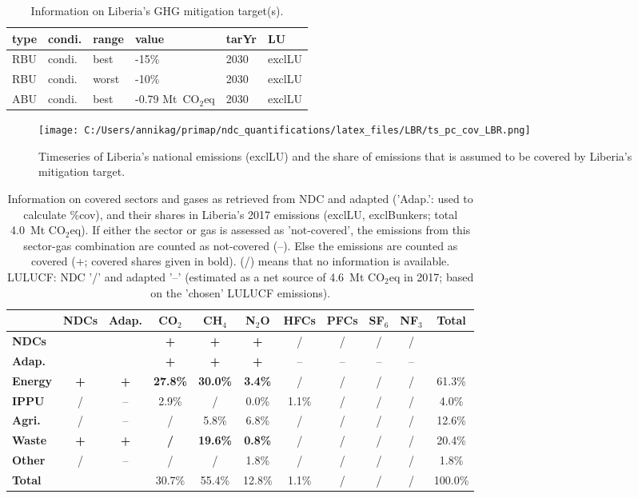 \documentclass[12pt]{article}
\begin{document}
 \begin{table}[H]
 \centering
 \caption{Information on Liberia's GHG mitigation target(s).}
 \label{tab:mitiTars}
 \begin{tabular}{l l l l l l }
 \bfseries type & \bfseries condi. & \bfseries range & \bfseries value & \bfseries tarYr & \bfseries LU \tabularnewline \hline
 RBU & condi. & best & -15\% & 2030 & exclLU \tabularnewline 
 RBU & condi. & worst & -10\% & 2030 & exclLU \tabularnewline 
 ABU & condi. & best & -0.79 Mt~CO$_2$eq & 2030 & exclLU \tabularnewline 
 \end{tabular}
 \end{table}

 \begin{figure}[H]
 \centering
 \texttt{[image: C:/Users/annikag/primap/ndc\_quantifications/latex\_files/LBR/ts\_pc\_cov\_LBR.png]}
 \caption{Timeseries of Liberia's national emissions (exclLU) and the share of emissions that is assumed to be covered by Liberia's mitigation target.}
 \label{fig:tsPcCov}
 \end{figure}

 \begin{table}[H]\small
 \centering
 \caption{Information on covered sectors and gases as retrieved from NDC and adapted ('Adap.': used to calculate \%cov), and their shares in Liberia's 2017 emissions (exclLU, exclBunkers; total 4.0~Mt CO$_2$eq).
 If either the sector or gas is assessed as 'not-covered', the emissions from this sector-gas combination are counted as not-covered (--). 
 Else the emissions are counted as covered (+; covered shares given in bold).
 (/) means that no information is available.
 LULUCF: NDC '/' and adapted '--' (estimated as a net source of 4.6~Mt CO$_2$eq in 2017; based on the 'chosen' LULUCF emissions).}
 \label{tab:coveredSectorsGases}
 \begin{tabular}{l || c c || c c c c c c c | c}
 \bfseries  & \bfseries NDCs & \bfseries Adap. & \bfseries CO$_2$ & \bfseries CH$_4$ & \bfseries N$_2$O & \bfseries HFCs & \bfseries PFCs & \bfseries SF$_6$ & \bfseries NF$_3$ & \bfseries Total \tabularnewline \hline \hline
 \bfseries NDCs &  &  & \bfseries + & \bfseries + & \bfseries + & / & / & / & / &  \tabularnewline 
 \bfseries Adap. &  &  & \bfseries + & \bfseries + & \bfseries + & -- & -- & -- & -- &  \tabularnewline \hline \hline
 \bfseries Energy & \bfseries + & \bfseries + & \bfseries 27.8\% & \bfseries 30.0\% & \bfseries 3.4\% & / & / & / & / & 61.3\% \tabularnewline 
 \bfseries IPPU & / & -- & 2.9\% & / & 0.0\% & 1.1\% & / & / & / & 4.0\% \tabularnewline 
 \bfseries Agri. & / & -- & / & 5.8\% & 6.8\% & / & / & / & / & 12.6\% \tabularnewline 
 \bfseries Waste & \bfseries + & \bfseries + & \bfseries / & \bfseries 19.6\% & \bfseries 0.8\% & / & / & / & / & 20.4\% \tabularnewline 
 \bfseries Other & / & -- & / & / & 1.8\% & / & / & / & / & 1.8\% \tabularnewline \hline
 \bfseries Total &  &  & 30.7\% & 55.4\% & 12.8\% & 1.1\% & / & / & / & 100.0\% \tabularnewline 
 \end{tabular}
 \end{table}
\end{document}
